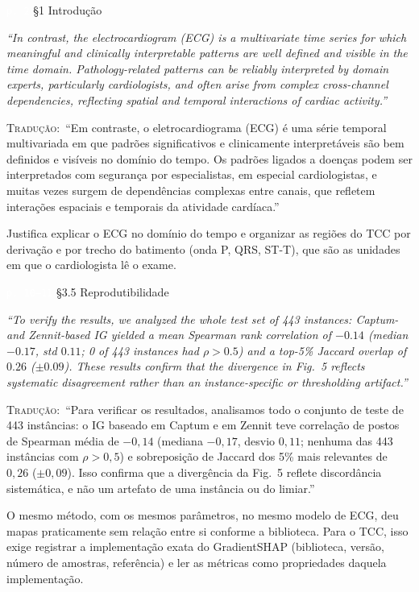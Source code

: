 \documentclass[11pt,a4paper]{article}
\newcommand{\pagechip}[1]{{\setlength{\fboxsep}{1.5pt}\colorbox{cAcc}{\textcolor{white}{\scriptsize\texttt{#1}}}}}
\newenvironment{origquote}{\par\itshape\small}{\par}
\newenvironment{tradquote}{\par\small\textsc{Tradução:}\ }{\par}
\newcommand{\explab}[1]{\par\smallskip{\small\color{cAcc}\textbf{\MakeUppercase{#1}}}\par}
\begin{document}
\begin{citacard}{\pagechip{p. 2} §1 Introdução}
\begin{origquote}“In contrast, the electrocardiogram (ECG) is a multivariate time series for which meaningful and clinically interpretable patterns are well defined and visible in the time domain. Pathology-related patterns can be reliably interpreted by domain experts, particularly cardiologists, and often arise from complex cross-channel dependencies, reflecting spatial and temporal interactions of cardiac activity.”\end{origquote}
\begin{tradquote}“Em contraste, o eletrocardiograma (ECG) é uma série temporal multivariada em que padrões significativos e clinicamente interpretáveis são bem definidos e visíveis no domínio do tempo. Os padrões ligados a doenças podem ser interpretados com segurança por especialistas, em especial cardiologistas, e muitas vezes surgem de dependências complexas entre canais, que refletem interações espaciais e temporais da atividade cardíaca.”\end{tradquote}
\explab{Explicação}
Justifica explicar o ECG no domínio do tempo e organizar as regiões do TCC por derivação e por trecho do batimento (onda P, QRS, ST-T), que são as unidades em que o cardiologista lê o exame.
\end{citacard}

\begin{citacard}{\pagechip{p. 10--11} §3.5 Reprodutibilidade}
\begin{origquote}“To verify the results, we analyzed the whole test set of 443 instances: Captum- and Zennit-based IG yielded a mean Spearman rank correlation of $-0.14$ (median $-0.17$, std $0.11$; 0 of 443 instances had $\rho > 0.5$) and a top-5\% Jaccard overlap of $0.26$ ($\pm 0.09$). These results confirm that the divergence in Fig.~5 reflects systematic disagreement rather than an instance-specific or thresholding artifact.”\end{origquote}
\begin{tradquote}“Para verificar os resultados, analisamos todo o conjunto de teste de 443 instâncias: o IG baseado em Captum e em Zennit teve correlação de postos de Spearman média de $-0{,}14$ (mediana $-0{,}17$, desvio $0{,}11$; nenhuma das 443 instâncias com $\rho > 0{,}5$) e sobreposição de Jaccard dos 5\% mais relevantes de $0{,}26$ ($\pm 0{,}09$). Isso confirma que a divergência da Fig.~5 reflete discordância sistemática, e não um artefato de uma instância ou do limiar.”\end{tradquote}
\explab{Explicação}
O mesmo método, com os mesmos parâmetros, no mesmo modelo de ECG, deu mapas praticamente sem relação entre si conforme a biblioteca. Para o TCC, isso exige registrar a implementação exata do GradientSHAP (biblioteca, versão, número de amostras, referência) e ler as métricas como propriedades daquela implementação.
\end{citacard}
\end{document}

